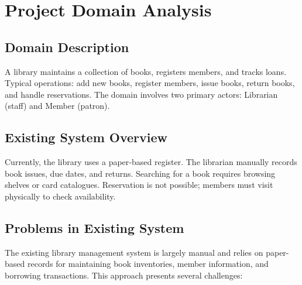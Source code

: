 
\section{Project Domain Analysis}

\subsection{Domain Description}
A library maintains a collection of books, registers members, and tracks loans. Typical operations: add new books, register members, issue books, return books, and handle reservations. The domain involves two primary actors: Librarian (staff) and Member (patron).

\subsection{Existing System Overview}
Currently, the library uses a paper‑based register. The librarian manually records book issues, due dates, and returns. Searching for a book requires browsing shelves or card catalogues. Reservation is not possible; members must visit physically to check availability.

\subsection{Problems in Existing System}

The existing library management system is largely manual and relies on paper-based records for maintaining book inventories, member information, and borrowing transactions. This approach presents several challenges:

